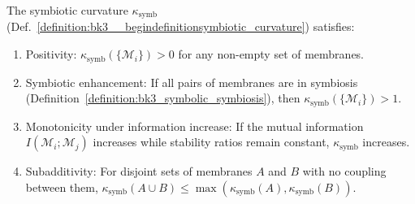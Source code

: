 \begin{theorem} \label{theorem:bk3__begintheoremproperties_of_symbiotic_cur}
The symbiotic curvature $\kappa_{\text{symb}}$ (Def.~\ref{definition:bk3__begindefinitionsymbiotic_curvature}) satisfies:
\begin{enumerate}
    \item Positivity: $\kappa_{\text{symb}}(\{\mathcal{M}_i\}) > 0$ for any non-empty set of membranes.
    \item Symbiotic enhancement: If all pairs of membranes are in symbiosis (Definition~\ref{definition:bk3_symbolic_symbiosis}), then $\kappa_{\text{symb}}(\{\mathcal{M}_i\}) > 1$.
    \item Monotonicity under information increase: If the mutual information $I(\mathcal{M}_i; \mathcal{M}_j)$ increases while stability ratios remain constant, $\kappa_{\text{symb}}$ increases.
    \item Subadditivity: For disjoint sets of membranes $A$ and $B$ with no coupling between them, $\kappa_{\text{symb}}(A \cup B) \leq \max(\kappa_{\text{symb}}(A), \kappa_{\text{symb}}(B))$.
\end{enumerate}
\end{theorem}


